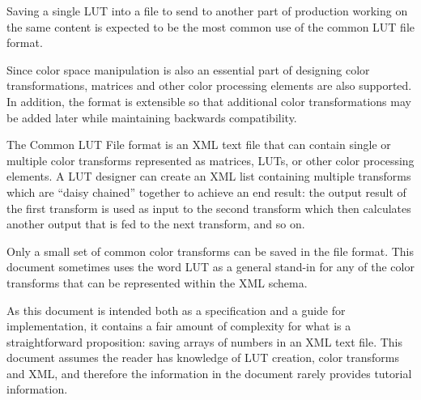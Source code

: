 Saving a single LUT into a file to send to another part of production working on the same content is expected to be the most common use of the common LUT file format.

Since color space manipulation is also an essential part of designing color transformations, matrices and other color processing elements are also supported.  In addition, the format is extensible so that additional color transformations may be added later while maintaining backwards compatibility.  

The Common LUT File format is an XML text file that can contain single or multiple color transforms represented as matrices, LUTs, or other color processing elements.  A LUT designer can create an XML list containing multiple transforms which are ``daisy chained'' together to achieve an end result: the output result of the first transform is used as input to the second transform which then calculates another output that is fed to the next transform, and so on.

Only a small set of common color transforms can be saved in the file format.  This document sometimes uses the word LUT as a general stand-in for any of the color transforms that can be represented within the XML schema.

As this document is intended both as a specification and a guide for implementation, it contains a fair amount of complexity for what is a straightforward proposition: saving arrays of numbers in an XML text file.  This document assumes the reader has knowledge of LUT creation, color transforms and XML, and therefore the information in the document rarely provides tutorial information.